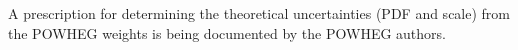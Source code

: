 A prescription for determining the theoretical uncertainties (PDF and scale) from the POWHEG weights is being documented by the POWHEG authors.